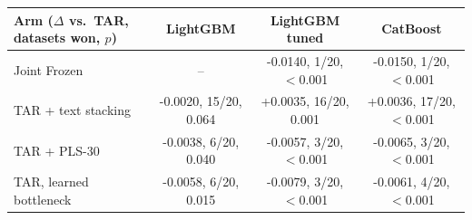 \begin{tabular}{lccc}
\toprule
Arm ($\Delta$ vs.\ TAR, datasets won, $p$) & LightGBM & LightGBM tuned & CatBoost \\
\midrule
Joint Frozen & -- & -0.0140, 1/20, $<$0.001 & -0.0150, 1/20, $<$0.001 \\
TAR + text stacking & -0.0020, 15/20, 0.064 & +0.0035, 16/20, 0.001 & +0.0036, 17/20, $<$0.001 \\
TAR + PLS-30 & -0.0038, 6/20, 0.040 & -0.0057, 3/20, $<$0.001 & -0.0065, 3/20, $<$0.001 \\
TAR, learned bottleneck & -0.0058, 6/20, 0.015 & -0.0079, 3/20, $<$0.001 & -0.0061, 4/20, $<$0.001 \\
\bottomrule
\end{tabular}

